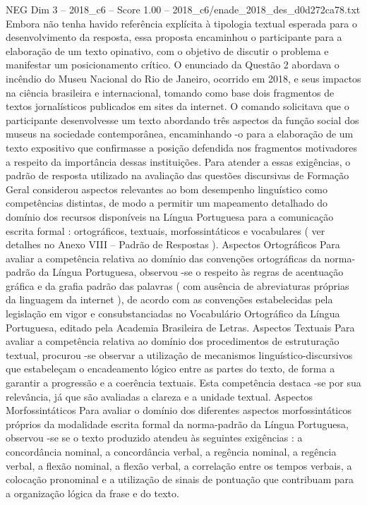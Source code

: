 \begin{textsample}{NEG Dim 3 – 2018\_c6 – Score 1.00 – 2018\_c6/enade\_2018\_des\_d0d272ca78.txt}
Embora não tenha havido referência explícita à tipologia textual esperada para o desenvolvimento da resposta, essa proposta encaminhou o participante para a elaboração de um texto opinativo, com o objetivo de discutir o problema e manifestar um posicionamento crítico.
O enunciado da Questão 2 abordava o incêndio do Museu Nacional do Rio de Janeiro, ocorrido em 2018, e seus impactos na ciência brasileira e internacional, tomando como base dois fragmentos de textos jornalísticos publicados em sites da internet.
O comando solicitava que o participante desenvolvesse um texto abordando três aspectos da função social dos museus na sociedade contemporânea, encaminhando -o para a elaboração de um texto expositivo que confirmasse a posição defendida nos fragmentos motivadores a respeito da importância dessas instituições.
Para atender a essas exigências, o padrão de resposta utilizado na avaliação das questões discursivas de Formação Geral considerou aspectos relevantes ao bom desempenho linguístico como competências distintas, de modo a permitir um mapeamento detalhado do domínio dos recursos disponíveis na Língua Portuguesa para a comunicação escrita formal : ortográficos, textuais, morfossintáticos e vocabulares ( ver detalhes no Anexo VIII – Padrão de Respostas ).
Aspectos Ortográficos Para avaliar a competência relativa ao domínio das convenções ortográficas da norma-padrão da Língua Portuguesa, observou -se o respeito às regras de acentuação gráfica e da grafia padrão das palavras ( com ausência de abreviaturas próprias da linguagem da internet ), de acordo com as convenções estabelecidas pela legislação em vigor e consubstanciadas no Vocabulário Ortográfico da Língua Portuguesa, editado pela Academia Brasileira de Letras.
Aspectos Textuais Para avaliar a competência relativa ao domínio dos procedimentos de estruturação textual, procurou -se observar a utilização de mecanismos linguístico-discursivos que estabeleçam o encadeamento lógico entre as partes do texto, de forma a garantir a progressão e a coerência textuais.
Esta competência destaca -se por sua relevância, já que são avaliadas a clareza e a unidade textual.
Aspectos Morfossintáticos Para avaliar o domínio dos diferentes aspectos morfossintáticos próprios da modalidade escrita formal da norma-padrão da Língua Portuguesa, observou -se se o texto produzido atendeu às seguintes exigências : a concordância nominal, a concordância verbal, a regência nominal, a regência verbal, a flexão nominal, a flexão verbal, a correlação entre os tempos verbais, a colocação pronominal e a utilização de sinais de pontuação que contribuam para a organização lógica da frase e do texto.

\end{textsample}
